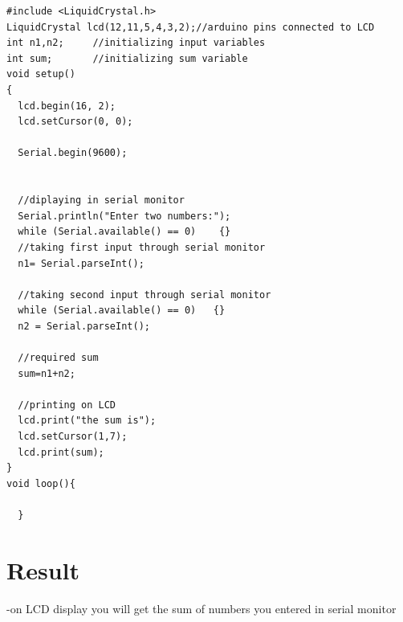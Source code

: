 \documentclass[twocolumn,13pt]{article}
\begin{document}
\begin{verbatim}
#include <LiquidCrystal.h>
LiquidCrystal lcd(12,11,5,4,3,2);//arduino pins connected to LCD
int n1,n2;     //initializing input variables
int sum;       //initializing sum variable
void setup()
{
  lcd.begin(16, 2);
  lcd.setCursor(0, 0);
  
  Serial.begin(9600);

  
  //diplaying in serial monitor
  Serial.println("Enter two numbers:");  
  while (Serial.available() == 0)    {}
  //taking first input through serial monitor
  n1= Serial.parseInt();                 
 
  //taking second input through serial monitor
  while (Serial.available() == 0)   {}  
  n2 = Serial.parseInt();

  //required sum
  sum=n1+n2;

  //printing on LCD
  lcd.print("the sum is");
  lcd.setCursor(1,7);
  lcd.print(sum);                     
}
void loop(){
    
  }
 \end{verbatim}


\section*{Result}
-on LCD display you will get the sum of numbers you entered in serial monitor
\end{document}

